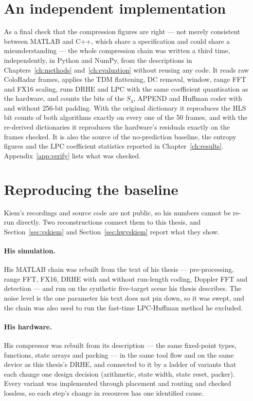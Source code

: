 \section{An independent implementation}
\label{sec:indep}

As a final check that the compression figures are right --- not merely
consistent between MATLAB and C++, which share a specification and could share
a misunderstanding --- the whole compression chain was written a third time,
independently, in Python and NumPy, from the descriptions in
Chapters~\ref{ch:methods} and~\ref{ch:evaluation} without reusing any code. It
reads raw ColoRadar frames, applies the TDM flattening, DC removal, window,
range FFT and FX16 scaling, runs DRHE and LPC with the same coefficient
quantisation as the hardware, and counts the bits of the $S_4$, APPEND and
Huffman coder with and without 256-bit padding. With the original dictionary
it reproduces the HLS bit counts of both algorithms exactly on every one of the
50 frames, and with the re-derived dictionaries it reproduces the hardware's
residuals exactly on the frames checked. It is also the
source of the no-prediction baseline, the entropy figures and the LPC
coefficient statistics reported in Chapter~\ref{ch:results}.
Appendix~\ref{app:verify} lists what was checked.

\section{Reproducing the baseline}
\label{sec:repbaseline}

Kiem's recordings and source code are not public, so his numbers cannot be
re-run directly. Two reconstructions connect them to this thesis, and
Section~\ref{sec:vskiem} and Section~\ref{sec:hwvskiem} report what they show.

\paragraph{His simulation.} His MATLAB chain was rebuilt from the text of his
thesis --- pre-processing, range FFT, FX16, DRHE with and without run-length
coding, Doppler FFT and detection --- and run on the synthetic five-target scene
his thesis describes. The noise level is the one parameter his text does not
pin down, so it was swept, and the chain was also used to run the fast-time
LPC-Huffman method he excluded.

\paragraph{His hardware.} His compressor was rebuilt from its description ---
the same fixed-point types, functions, state arrays and packing --- in the same
tool flow and on the same device as this thesis's DRHE, and connected to it by
a ladder of variants that each change one design decision (arithmetic, state
width, state reset, packer). Every variant was implemented through placement
and routing and checked lossless, so each step's change in resources has one
identified cause.

